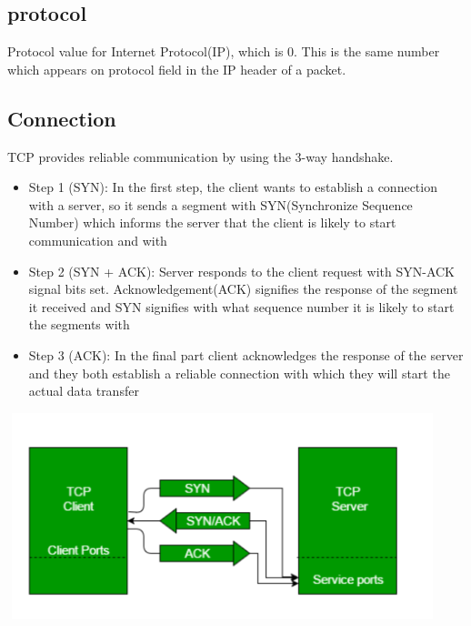 \documentclass{article}
\begin{document}
\subsection{protocol}
Protocol value for Internet Protocol(IP), which is 0. This is the same number which appears on protocol field in the IP header of a packet. 
\subsection{Connection}
TCP provides reliable communication by using the 3-way handshake.
\begin{itemize}
  \item Step 1 (SYN): In the first step, the client wants to establish a connection with a server, so it sends a segment with SYN(Synchronize Sequence Number) which informs the server that the client is likely to start communication and with
  \item Step 2 (SYN + ACK): Server responds to the client request with SYN-ACK signal bits set. Acknowledgement(ACK) signifies the response of the segment it received and SYN signifies with what sequence number it is likely to start the segments with
  \item Step 3 (ACK): In the final part client acknowledges the response of the server and they both establish a reliable connection with which they will start the actual data transfer
\end{itemize}
\includegraphics[width=125mm,height=60mm]{3way}\\
\clearpage
\end{document}
